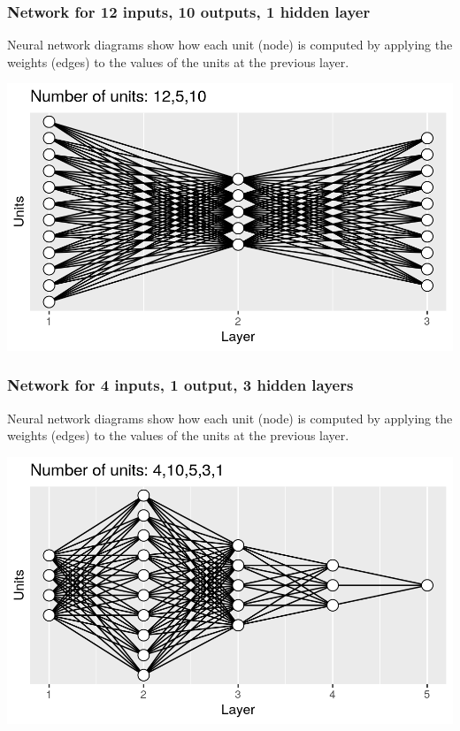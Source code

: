 \documentclass{beamer}
\begin{document}
\begin{frame}
  \frametitle{Network for 12 inputs, 10 outputs, 1 hidden layer}
  Neural network
  diagrams show how each unit (node) is computed by applying the
  weights (edges) to the values of the units at the previous layer.

\includegraphics[width=\textwidth]{figure-architecture-tenOut}
\end{frame}

\begin{frame}
  \frametitle{Network for 4 inputs, 1 output, 3 hidden layers}
  Neural network
  diagrams show how each unit (node) is computed by applying the
  weights (edges) to the values of the units at the previous layer.

\includegraphics[width=\textwidth]{figure-architecture-fiveLayers}
\end{frame}
\end{document}
